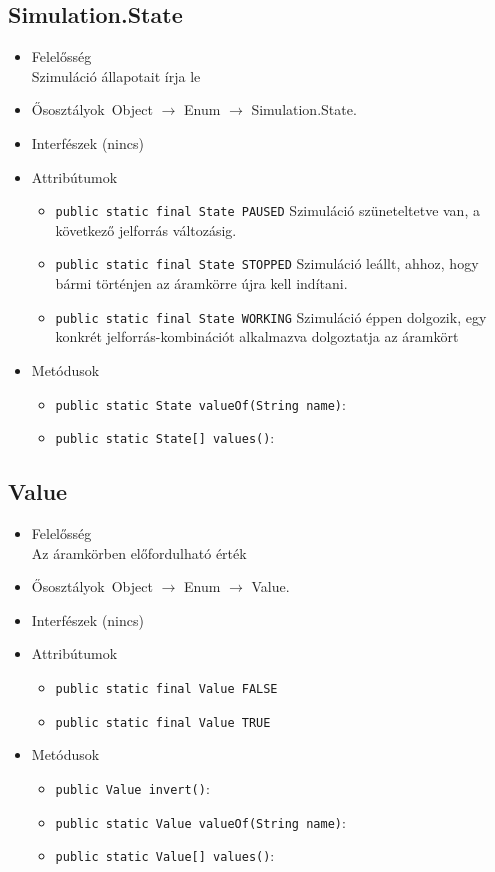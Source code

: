\subsection{Simulation.State}
\begin{itemize}
\item Felelősség\\
Szimuláció állapotait írja le
\item Ősosztályok\ Object $\rightarrow{}$ Enum $\rightarrow{}$ Simulation.State.
\item Interfészek (nincs)
\item Attribútumok $\ $
\begin{itemize}
	\item \texttt{public static final State PAUSED} Szimuláció szüneteltetve van, a következő jelforrás változásig.
	\item \texttt{public static final State STOPPED} Szimuláció leállt, ahhoz, hogy bármi történjen az áramkörre újra kell indítani.
	\item \texttt{public static final State WORKING} Szimuláció éppen dolgozik, egy konkrét jelforrás-kombinációt alkalmazva dolgoztatja az áramkört
\end{itemize}
\item Metódusok$\ $
\begin{itemize}
	\item \texttt{public static State valueOf(String name)}: 
	\item \texttt{public static State[] values()}: 
\end{itemize}
\end{itemize}

\subsection{Value}
\begin{itemize}
\item Felelősség\\
Az áramkörben előfordulható érték
\item Ősosztályok\ Object $\rightarrow{}$ Enum $\rightarrow{}$ Value.
\item Interfészek (nincs)
\item Attribútumok $\ $
\begin{itemize}
	\item \texttt{public static final Value FALSE} 
	\item \texttt{public static final Value TRUE} 
\end{itemize}
\item Metódusok$\ $
\begin{itemize}
	\item \texttt{public Value invert()}: 
	\item \texttt{public static Value valueOf(String name)}: 
	\item \texttt{public static Value[] values()}: 
\end{itemize}
\end{itemize}

